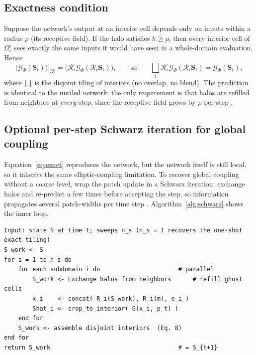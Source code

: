 \documentclass[11pt]{article}
\newcommand{\Rop}{\mathcal{R}}
\newcommand{\Gfine}{\mathcal{G}_{\Phi}}
\begin{document}
\subsection{Exactness condition}
Suppose the network's output at an interior cell depends only on inputs within a
radius $\rho$ (its receptive field). If the halo satisfies $h\ge\rho$, then every
interior cell of $\Omega_i^\circ$ sees exactly the same inputs it would have seen
in a whole-domain evaluation. Hence
\begin{equation}
\big(\Gfine(\bm S_t)\big)\big|_{\Omega_i^\circ}
= \big(\Rop_i^\circ \Gfine(\Rop_i \bm S_t)\big),
\qquad\text{so}\qquad
\bigsqcup_{i} \Rop_i^\circ \Gfine(\Rop_i \bm S_t) = \Gfine(\bm S_t),
\label{eq:exact}
\end{equation}
where $\bigsqcup$ is the disjoint tiling of interiors (no overlap, no blend). The
prediction is identical to the untiled network; the only requirement is that
halos are refilled from neighbors at \emph{every} step, since the receptive field
grows by $\rho$ per step \cite{barwey2024consistentgnn,ronneberger2015unet}.

\subsection{Optional per-step Schwarz iteration for global coupling}
Equation~\eqref{eq:exact} reproduces the network, but the network itself is still
local, so it inherits the same elliptic-coupling limitation. To recover global
coupling without a coarse level, wrap the patch update in a Schwarz iteration:
exchange halos and re-predict a few times before accepting the step, so
information propagates several patch-widths per time step
\cite{li2020deepddm,huang2025operatorddm}. Algorithm~\ref{alg:schwarz} shows the
inner loop.

\begin{algorithm}[t]
\caption{Per-step consistent update with optional Schwarz sweeps}
\label{alg:schwarz}
\begin{lstlisting}[style=pseudo]
Input: state S at time t; sweeps n_s (n_s = 1 recovers the one-shot exact tiling)
S_work <- S
for s = 1 to n_s do
    for each subdomain i do                      # parallel
        S_work <- Exchange halos from neighbors      # refill ghost cells
        x_i    <- concat( R_i(S_work), R_i(m), e_i )
        Shat_i <- crop_to_interior( G(x_i, p_t) )
    end for
    S_work <- assemble disjoint interiors  (Eq. 8)
end for
return S_work                                    # = S_{t+1}
\end{lstlisting}
\end{algorithm}
\end{document}
